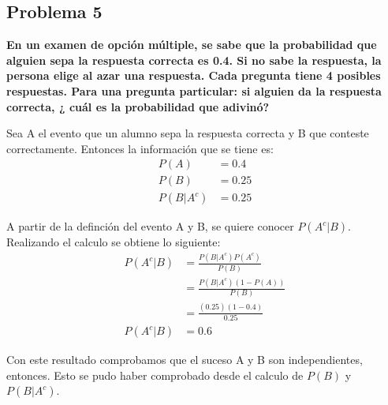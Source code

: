 \pagebreak
\subsection*{Problema 5}
\textbf{En un examen de opción múltiple, se sabe que la probabilidad que alguien sepa la respuesta correcta es 0.4. Si no sabe la respuesta, la persona elige al azar una respuesta. Cada pregunta tiene 4 posibles respuestas. Para una pregunta particular: si alguien da la respuesta correcta, ¿ cuál es la probabilidad que adivinó?}

Sea A el evento que un alumno sepa la respuesta correcta y B que conteste correctamente. Entonces la información que se tiene es:
\begin{align*}
    P(A)     & = 0.4  \\
    P(B)     & = 0.25 \\
    P(B|A^c) & = 0.25
\end{align*}

A partir de la definción del evento A y B, se quiere conocer $P(A^c|B)$. Realizando el calculo se obtiene lo siguiente:
\begin{align*}
    P(A^c|B) & = \frac{P(B|A^c)P(A^c)}{P(B)}   \\
             & = \frac{P(B|A^c)(1-P(A))}{P(B)} \\
             & =\frac{(0.25)(1-0.4)}{0.25}     \\
    P(A^c|B) & = 0.6
\end{align*}

Con este resultado comprobamos que el suceso A y B son independientes, entonces. Esto se pudo haber comprobado desde el calculo de $P(B)$ y $P(B|A^c)$.